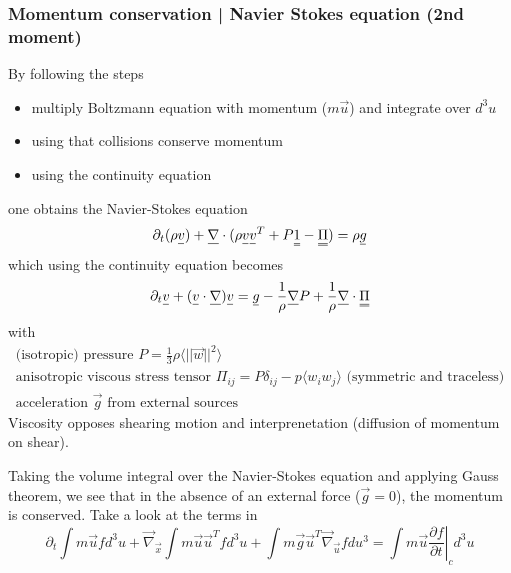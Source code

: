 \subsubsection{Momentum conservation | Navier Stokes equation (2nd moment)}
By following the steps
\begin{itemize}
    \item multiply Boltzmann equation with momentum ($m\vec{u}$) and integrate over $d^3u$
    \item using that collisions conserve momentum
    \item using the continuity equation
\end{itemize}
\begin{mdframed}[style = padded]
one obtains the Navier-Stokes equation
\begin{equation}
    \partial_t (\rho \vec{v}) + \vec{\nabla} \cdot (\rho \vec{v}\vec{v}^T + P\mat{1} - \mat{\Pi}) = \rho \vec{g}
\end{equation}
which using the continuity equation becomes
\begin{equation}
    \partial_t \vec{v} + (\vec{v} \cdot \vec{\nabla}) \vec{v} = \vec{g} - \frac{1}{\rho} \vec{\nabla}P + \frac{1}{\rho} \vec{\nabla} \cdot \mat{\Pi}
\end{equation}
with
\begin{equation}
    \begin{gathered}
        \text{(isotropic) pressure } P = \frac{1}{3} \rho \langle ||\vec{w}||^2 \rangle \\
        \text{anisotropic viscous stress tensor } \Pi_{ij} = P\delta_{ij} - p \langle w_iw_j \rangle \text{ (symmetric and traceless)} \\
        \text{acceleration }\vec{g} \text{ from external sources }
    \end{gathered}
\end{equation}
Viscosity opposes shearing motion and interprenetation (diffusion of momentum on shear).
\end{mdframed}
Taking the volume integral over the Navier-Stokes equation and applying Gauss theorem, we see that in the absence
of an external force ($\vec{g} = 0$), the momentum is conserved.
Take a look at the terms in
\begin{equation}
     \partial_t \int m \vec{u} f d^3u + \vec{\nabla}_\vec{x} \int m \vec{u} \vec{u}^T f d^3u + \int m \vec{g} \vec{u}^T \vec{\nabla}_\vec{u} f du^3 = \int m \vec{u} \left. \frac{\partial f}{\partial t} \right|_c d^3u 
\end{equation}
